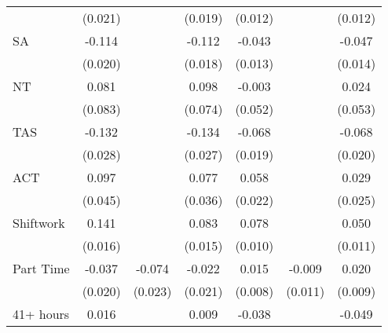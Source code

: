 {\begin{tabular}{l*{6}{c}}
                    &     (0.021)         &                     &     (0.019)         &     (0.012)         &                     &     (0.012)         \\
SA                  &      -0.114\sym{***}&                     &      -0.112\sym{***}&      -0.043\sym{***}&                     &      -0.047\sym{***}\\
                    &     (0.020)         &                     &     (0.018)         &     (0.013)         &                     &     (0.014)         \\
NT                  &       0.081         &                     &       0.098         &      -0.003         &                     &       0.024         \\
                    &     (0.083)         &                     &     (0.074)         &     (0.052)         &                     &     (0.053)         \\
TAS                 &      -0.132\sym{***}&                     &      -0.134\sym{***}&      -0.068\sym{***}&                     &      -0.068\sym{***}\\
                    &     (0.028)         &                     &     (0.027)         &     (0.019)         &                     &     (0.020)         \\
ACT                 &       0.097\sym{**} &                     &       0.077\sym{**} &       0.058\sym{***}&                     &       0.029         \\
                    &     (0.045)         &                     &     (0.036)         &     (0.022)         &                     &     (0.025)         \\
Shiftwork           &       0.141\sym{***}&                     &       0.083\sym{***}&       0.078\sym{***}&                     &       0.050\sym{***}\\
                    &     (0.016)         &                     &     (0.015)         &     (0.010)         &                     &     (0.011)         \\
Part Time           &      -0.037\sym{*}  &      -0.074\sym{***}&      -0.022         &       0.015\sym{*}  &      -0.009         &       0.020\sym{**} \\
                    &     (0.020)         &     (0.023)         &     (0.021)         &     (0.008)         &     (0.011)         &     (0.009)         \\
41+ hours           &       0.016         &                     &       0.009         &      -0.038\sym{***}&                     &      -0.049\sym{***}\\

\end{tabular}}
